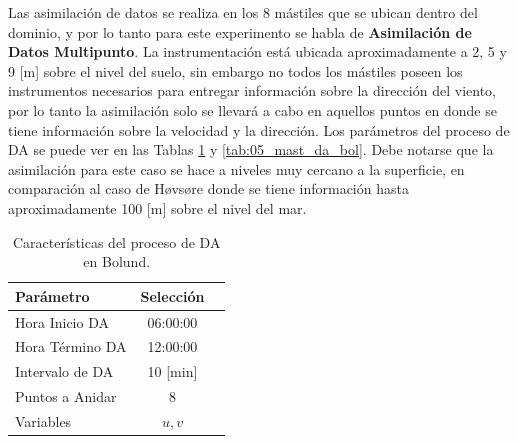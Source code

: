 Las asimilación de datos se realiza en los 8 mástiles que se ubican dentro del dominio, y por lo tanto para este experimento se habla de \textbf{Asimilación de Datos Multipunto}. La instrumentación está ubicada aproximadamente a 2, 5 y 9 [m] sobre el nivel del suelo, sin embargo no todos los mástiles poseen los instrumentos necesarios para entregar información sobre la dirección del viento, por lo tanto la asimilación solo se llevará a cabo en aquellos puntos en donde se tiene información sobre la velocidad y la dirección. Los parámetros del proceso de DA se puede ver en las Tablas \ref{tab:05_config_da_bol} y \ref{tab:05_mast_da_bol}. Debe notarse que la asimilación para este caso se hace a niveles muy cercano a la superficie, en comparación al caso de Høvsøre donde se tiene información hasta aproximadamente 100 [m] sobre el nivel del mar.

\begin{table}[h!]
	\caption{Características del proceso de DA en Bolund.}\label{tab:05_config_da_bol}
	\centering\footnotesize
	\begin{tabular}{lcc}
		\toprule
		Parámetro & Selección \\
		\midrule
		Hora Inicio	DA 	 & 06:00:00   \\
		Hora Término DA	 		 & 12:00:00  \\
		Intervalo de DA	&	10 [min] \\
		Puntos a Anidar	 	 & 8   \\
		Variables	& $u,v$   \\
		\bottomrule
	\end{tabular}
\end{table}

\begin{table}[H]
	\caption{Detalle de la asimilación en cada mástil en Bolund.}\label{tab:05_mast_da_bol}
	\centering\footnotesize{}
\end{table}

